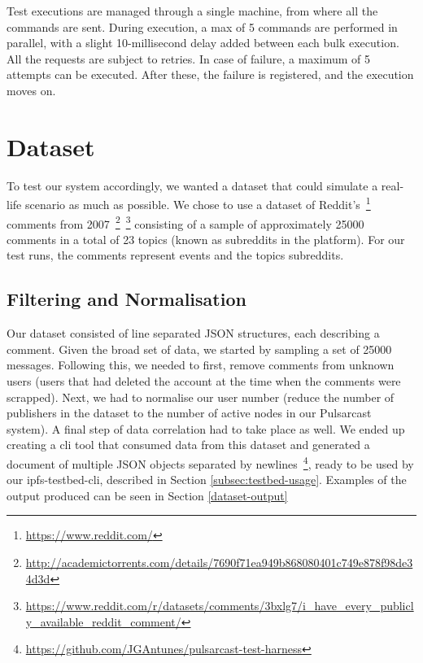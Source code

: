 Test executions are managed through a single machine, from where all the
commands are sent. During execution, a max of 5 commands are performed in
parallel, with a slight 10-millisecond delay added between each bulk execution.
All the requests are subject to retries. In case of failure, a maximum of 5
attempts can be executed. After these, the failure is registered, and the
execution moves on.

\section{Dataset}\label{dataset}

To test our system accordingly, we wanted a dataset that could simulate a
real-life scenario as much as possible. We chose to use a dataset of
Reddit's~\footnote{\url{https://www.reddit.com/}} comments from
2007~\footnote{\url{http://academictorrents.com/details/7690f71ea949b868080401c749e878f98de34d3d}}~\footnote{\url{https://www.reddit.com/r/datasets/comments/3bxlg7/i_have_every_publicly_available_reddit_comment/}}
consisting of a sample of approximately 25000 comments in a total of 23 topics
(known as subreddits in the platform). For our test runs, the comments
represent events and the topics subreddits.

\subsection{Filtering and Normalisation}\label{subsec:filtering}

Our dataset consisted of line separated JSON structures, each describing a
comment. Given the broad set of data, we started by sampling a set of 25000
messages.  Following this, we needed to first, remove comments from unknown
users (users that had deleted the account at the time when the comments were
scrapped). Next, we had to normalise our user number (reduce the number of
publishers in the dataset to the number of active nodes in our Pulsarcast
system). A final step of data correlation had to take place as well. We ended
up creating a \acrshort{cli} tool that consumed data from this dataset and
generated a document of multiple JSON objects separated by
newlines~\footnote{\url{https://github.com/JGAntunes/pulsarcast-test-harness}},
ready to be used by our ipfs-testbed-cli, described in Section
\ref{subsec:testbed-usage}. Examples of the output produced can be seen in
Section \ref{dataset-output}


